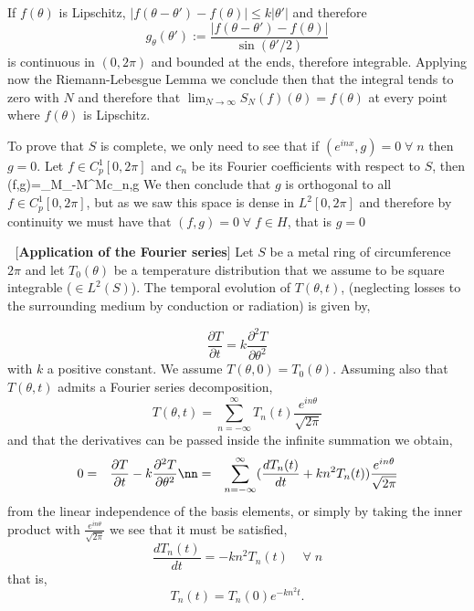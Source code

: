 If $f(\theta)$ is Lipschitz, $|f(\theta-\theta') -f(\theta)| \leq k|\theta'|$ and therefore 
\begin{equation} 
    g_{\theta}(\theta') := \frac{|f(\theta-\theta') -f(\theta)|}{\sin(\theta'/2)} 
\end{equation} %
is continuous in $(0,2\pi)$ and bounded at the ends, therefore integrable. 
Applying now the Riemann-Lebesgue Lemma we conclude then that the integral tends to zero with $N$ and therefore that $\lim_{N\to \infty} S_N(f)(\theta) = f(\theta)$ at every point where $f(\theta)$ is Lipschitz. 
\epru



To prove that $S$ is complete, we only need to see that if 
$(e^{inx},g)=0\; \forall\; n $ then $g =0$.
Let $f \in C^1_p[0,2\pi]$ and $c_n$ be its Fourier coefficients with respect to
$S$, then
\beq
(f,g)=\lim_{M\to \ifi}\lp\sum_{-M}^Mc_n,g
\eeq
We then conclude that $g$ is orthogonal to all $f \in
C^1_p[0,2\pi]$, but as we saw this space is dense in
$L^2[0,2\pi]$ and therefore by continuity we must have
that $(f,g) = 0\; \forall\; f \in H$, that is $g=0$ 
\epru
\espa

\ejem $\;$ [\textbf{Application of the Fourier series}]
Let $S$ be a metal ring of circumference $2\pi$ and let $T_0(\theta)$ be a temperature distribution that we assume to be square integrable ($\in L^2(S)$).
The temporal evolution of $T(\theta,t)$, 
(neglecting losses to the surrounding medium by conduction or radiation) is given by,

\begin{equation}
  \label{eq:calor}
  \frac{\partial T}{\partial t} = k \frac{\partial^2 T}{\partial \theta^2}
\end{equation}
%
with $k$ a positive constant. We assume $T(\theta,0)=T_0(\theta)$.
Assuming also that $T(\theta,t)$ admits
a Fourier series decomposition,
\begin{equation}
  \label{eq:T_fourier}
  T(\theta,t) = \sum^{\infty}_{n=-\infty} T_n(t) \frac{e^{in\theta}}{\sqrt{2\pi}}
\end{equation}
%
and that the derivatives can be passed
inside the infinite summation we obtain,
\begin{eqnarray}
  0&=&\frac{\partial T}{\partial t} - k \frac{\partial^2 T}{\partial \theta^2}\nn
   &=& \sum^{\infty}_{n=-\infty}(\frac{dT_n(t)}{dt} + k n^2 T_n(t)) \frac{e^{in\theta}}{\sqrt{2\pi}}
\end{eqnarray}
%
from the linear independence of the basis elements, or simply by taking the inner product with $\frac{e^{in\theta}}{\sqrt{2\pi}}$ we see that
it must be satisfied,
\begin{equation}
  \frac{dT_n(t)}{dt} = - k n^2 T_n(t) \;\;\;\; \forall \; n
\end{equation}
%
that is,
\begin{equation}
  T_n(t) = T_n(0) e^{-kn^2t}.
\end{equation}

